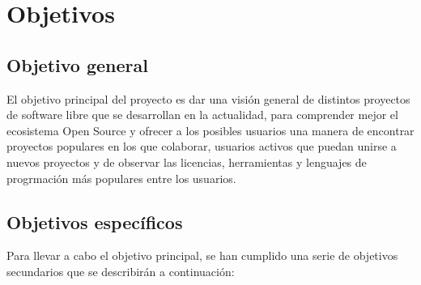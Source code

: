 \documentclass[a4paper, spanish, 12pt]{book}
\begin{document}

\cleardoublepage
\chapter{Objetivos}
\label{chap:objetivos}

\section{Objetivo general}
\label{sec:objetivo-general}

El objetivo principal del proyecto es dar una visi\'on general de distintos
proyectos de software libre que se desarrollan en la actualidad, para comprender
mejor el ecosistema Open Source y ofrecer a los posibles usuarios una manera de
encontrar proyectos populares en los que colaborar, usuarios activos que puedan
unirse a nuevos proyectos y de observar las licencias, herramientas y
lenguajes de progrmaci\'on m\'as populares entre los usuarios.

\section{Objetivos espec\'ificos}
\label{sec:objetivos-especificos}

Para llevar a cabo el objetivo principal, se han cumplido una serie de objetivos
secundarios que se describir\'an a continuaci\'on:
\end{document}
